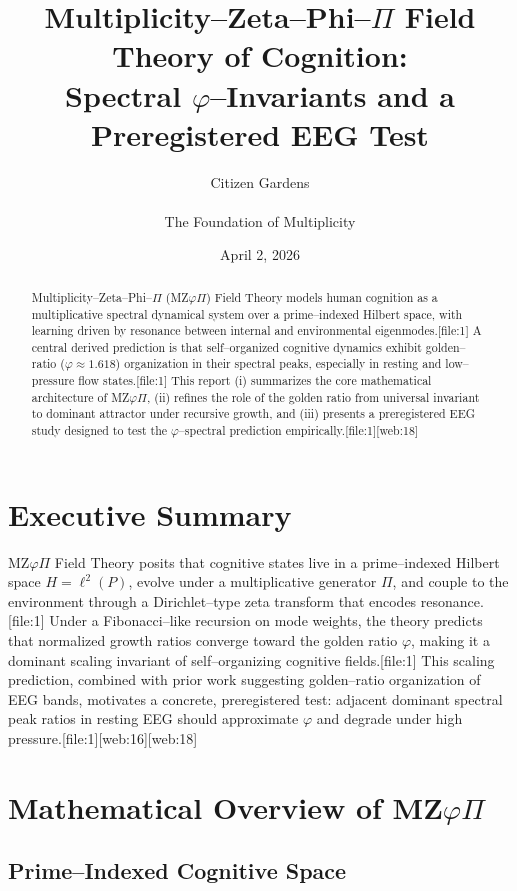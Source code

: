 \documentclass[11pt]{article}
\title{Multiplicity--Zeta--Phi--$\Pi$ Field Theory of Cognition:\\
Spectral $\varphi$--Invariants and a Preregistered EEG Test}
\author{Citizen Gardens \\ \\ The Foundation of Multiplicity}
\date{April 2, 2026}
\begin{document}
\maketitle

\begin{abstract}
Multiplicity--Zeta--Phi--$\Pi$ (MZ$\varphi\Pi$) Field Theory models human cognition as a multiplicative spectral dynamical system over a prime--indexed Hilbert space, with learning driven by resonance between internal and environmental eigenmodes.[file:1]
A central derived prediction is that self--organized cognitive dynamics exhibit golden--ratio ($\varphi \approx 1.618$) organization in their spectral peaks, especially in resting and low--pressure flow states.[file:1]
This report (i) summarizes the core mathematical architecture of MZ$\varphi\Pi$, (ii) refines the role of the golden ratio from universal invariant to dominant attractor under recursive growth, and (iii) presents a preregistered EEG study designed to test the $\varphi$--spectral prediction empirically.[file:1][web:18]
\end{abstract}

\section{Executive Summary}

MZ$\varphi\Pi$ Field Theory posits that cognitive states live in a prime--indexed Hilbert space $H = \ell^{2}(P)$, evolve under a multiplicative generator $\Pi$, and couple to the environment through a Dirichlet--type zeta transform that encodes resonance.[file:1]
Under a Fibonacci--like recursion on mode weights, the theory predicts that normalized growth ratios converge toward the golden ratio $\varphi$, making it a dominant scaling invariant of self--organizing cognitive fields.[file:1]
This scaling prediction, combined with prior work suggesting golden--ratio organization of EEG bands, motivates a concrete, preregistered test: adjacent dominant spectral peak ratios in resting EEG should approximate $\varphi$ and degrade under high pressure.[file:1][web:16][web:18]

\section{Mathematical Overview of MZ$\varphi\Pi$}

\subsection{Prime--Indexed Cognitive Space}
\end{document}
